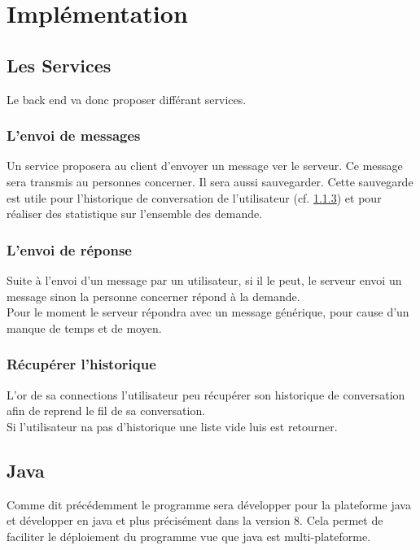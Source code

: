 \documentclass[12pt]{article}
\begin{document}
\section{Implémentation}

\subsection{Les Services}
Le back end va donc proposer différant services.

\subsubsection{L'envoi de messages}
Un service proposera au client d'envoyer un message ver le serveur.
Ce message sera	transmis au personnes concerner. Il sera aussi sauvegarder. Cette sauvegarde est utile pour l'historique de conversation de l'utilisateur (cf. \ref{recup_histo}) et pour réaliser des statistique sur l'ensemble des demande.


\subsubsection{L'envoi de réponse}
Suite à l'envoi d'un message par un utilisateur, si il le peut, le serveur envoi un message sinon la personne concerner répond à la demande.\\
Pour le moment le serveur répondra avec un message générique, pour cause d'un manque de temps et de moyen.


\subsubsection{Récupérer l'historique} \label{recup_histo}
L'or de sa connections l'utilisateur peu récupérer son historique de conversation afin de reprend le fil de sa conversation.
\\
Si l'utilisateur na pas d'historique une liste vide luis est retourner.



\subsection{Java}
Comme dit précédemment le programme sera développer pour la plateforme java et développer en java et plus précisément dans la version 8. Cela permet de faciliter le déploiement du programme vue que java est multi-plateforme.
\end{document}
